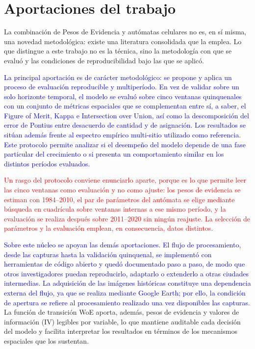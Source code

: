\section{Aportaciones del trabajo}

La combinación de Pesos de Evidencia y autómatas celulares no es, en sí misma, una novedad metodológica: existe una literatura consolidada que la emplea. Lo que distingue a este trabajo no es la técnica, sino la metodología con que se evaluó y las condiciones de reproducibilidad bajo las que se aplicó.

\textcolor{blue}{La principal aportación es de carácter metodológico: se propone y aplica un proceso de evaluación reproducible y multiperíodo. En vez de validar sobre un solo horizonte temporal, el modelo se evaluó sobre cinco ventanas quinquenales con un conjunto de métricas espaciales que se complementan entre sí, a saber, el Figure of Merit, Kappa e Intersection over Union, así como la descomposición del error de Pontius entre desacuerdo de cantidad y de asignación. Los resultados se sitúan además frente al espectro empírico multi-sitio utilizado como referencia. Este protocolo permite analizar si el desempeño del modelo depende de una fase particular del crecimiento o si presenta un comportamiento similar en los distintos períodos evaluados.}

\textcolor{red}{Un rasgo del protocolo conviene enunciarlo aparte, porque es lo que permite leer las cinco ventanas como evaluación y no como ajuste: los pesos de evidencia se estiman con 1984--2010, el par de parámetros del autómata se elige mediante búsqueda en cuadrícula sobre ventanas internas a ese mismo período, y la evaluación se realiza después sobre 2011--2020 sin ningún reajuste. La selección de parámetros y la evaluación emplean, en consecuencia, datos distintos.}



\textcolor{blue}{Sobre este núcleo se apoyan las demás aportaciones. El flujo de procesamiento, desde las capturas hasta la validación quinquenal, se implementó con herramientas de código abierto y quedó documentado paso a paso, de modo que otros investigadores puedan reproducirlo, adaptarlo o extenderlo a otras ciudades intermedias. La adquisición de las imágenes históricas constituye una dependencia externa del flujo, ya que se realiza mediante Google Earth; por ello, la condición de apertura se refiere al procesamiento realizado una vez disponibles las capturas.} La función de transición WoE aporta, además, pesos de evidencia y valores de información (IV) legibles por variable, lo que mantiene auditable cada decisión del modelo y facilita interpretar los resultados en términos de los mecanismos espaciales que los sustentan.

